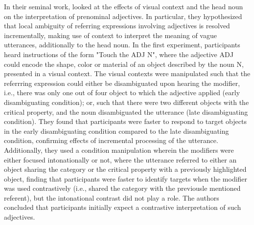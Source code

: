 In their seminal work, \textcite{sedivy1999} looked at the effects of visual context and the head noun on the interpretation of prenominal adjectives. In particular, they hypothesized that local ambiguity of referring expressions involving adjectives is resolved incrementally, making use of context to interpret the meaning of vague utterances, additionally to the head noun. 
In the first experiment, participants heard instructions of the form "Touch the ADJ N", where the adjective ADJ could encode the shape, color or material of an object described by the noun N, presented in a visual context. The visual contexts were manipulated such that the referrring expression could either be disambiguated upon hearing the modifier, i.e., there was only one out of four object to which the adjective applied (early disambiguating condition); or, such that there were two different objects with the critical property, and the noun disambiguated the utterance (late disambiguating condition). 
They found that participants were faster to respond to target objects in the early disambiguating condition compared to the late disambiguating condition, confirming effects of incremental processing of the utterance. 
 Additionally, they used a condition manipulation wherein the modifiers were either focused intonationally or not, where the utterance referred to either an object sharing the category or the critical property with a previously highlighted object, finding that participants were faster to identify targets when the modifier was used contrastively (i.e., shared the category with the previousle mentioned referent), but the intonational contrast  did not play a role. The authors concluded that participants initially expect a contrastive interpretation of such adjectives. 
